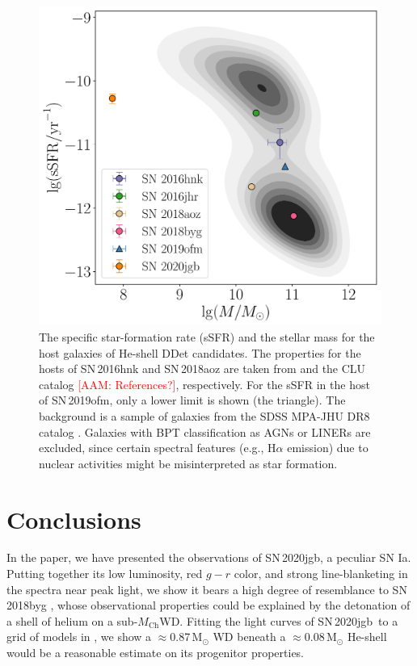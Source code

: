 \documentclass[twocolumn]{aastex631}
\newcommand{\sn}{SN\,2020jgb}
\newcommand{\Mch}{$M_\mathrm{Ch}$}
\newcommand{\adam}[1]{\textcolor{red}{[AAM: #1]}}
\begin{document}
\begin{figure}
    \centering
    \includegraphics[width=\linewidth]{host.pdf}
    \caption{The specific star-formation rate (sSFR) and the stellar mass for the host galaxies of He-shell DDet candidates. The properties for the hosts of SN\,2016hnk and SN\,2018aoz are taken from \citet{galbany_16hnk_2019} and the CLU catalog \adam{References?}, respectively. For the sSFR in the host of SN\,2019ofm, only a lower limit is shown (the triangle). The background is a sample of galaxies from the SDSS MPA-JHU DR8 catalog \citep{Kauffmann_SDSS_2003,Brinchmann_SDSS_2004}. Galaxies with BPT classification as AGNs or LINERs are excluded, since certain spectral features (e.g., H$\alpha$ emission) due to nuclear activities might be misinterpreted as star formation.}
    \label{fig:host}
\end{figure}

\section{Conclusions} \label{sec:conclusion}
In the paper, we have presented the observations of \sn, a peculiar SN Ia. Putting together its low luminosity, red $g-r$ color, and strong line-blanketing in the spectra near peak light, we show it bears a high degree of resemblance to SN\,2018byg \citep{de_18byg_2019}, whose observational properties could be explained by the detonation of a shell of helium on a sub-\Mch WD. Fitting the light curves of \sn\ to a grid of models in \citet{polin_observational_2019}, we show a $\approx$0.87\,$\mathrm{M_\odot}$ WD beneath a $\approx$0.08\,$\mathrm{M_\odot}$ He-shell would be a reasonable estimate on its progenitor properties.
\end{document}
